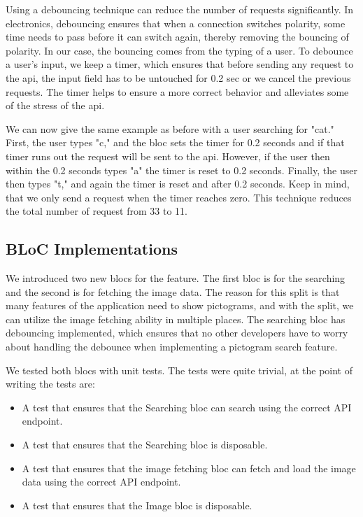 Using a debouncing technique can reduce the number of requests significantly. In electronics, debouncing ensures that when a connection switches polarity, some time needs to pass before it can switch again, thereby removing the bouncing of polarity. In our case, the bouncing comes from the typing of a user. To debounce a user's input, we keep a timer, which ensures that before sending any request to the \gls{api}, the input field has to be untouched for 0.2 sec or we cancel the previous requests. The timer helps to ensure a more correct behavior and alleviates some of the stress of the \gls{api}.

We can now give the same example as before with a user searching for "cat." First, the user types "c," and the \gls{bloc} sets the timer for 0.2 seconds and if that timer runs out the request will be sent to the \gls{api}. However, if the user then within the 0.2 seconds types "a" the timer is reset to 0.2 seconds. Finally, the user then types "t," and again the timer is reset and after 0.2 seconds. Keep in mind, that we only send a request when the timer reaches zero. This technique reduces the total number of request from 33 to 11.

\subsection{BLoC Implementations}

We introduced two new \glspl{bloc} for the feature. The first \gls{bloc} is for the searching and the second is for fetching the image data. The reason for this split is that many features of the application need to show pictograms, and with the split, we can utilize the image fetching ability in multiple places. The searching \gls{bloc} has debouncing implemented, which ensures that no other developers have to worry about handling the debounce when implementing a pictogram search feature.

We tested both \glspl{bloc} with unit tests. The tests were quite trivial, at the point of writing the tests are:

\begin{itemize}
  \item A test that ensures that the Searching \gls{bloc} can search using the correct API endpoint.
  \item A test that ensures that the Searching \gls{bloc} is disposable.
  \item A test that ensures that the image fetching \gls{bloc} can fetch and load the image data using the correct API endpoint.
  \item A test that ensures that the Image \gls{bloc} is disposable.
\end{itemize}

